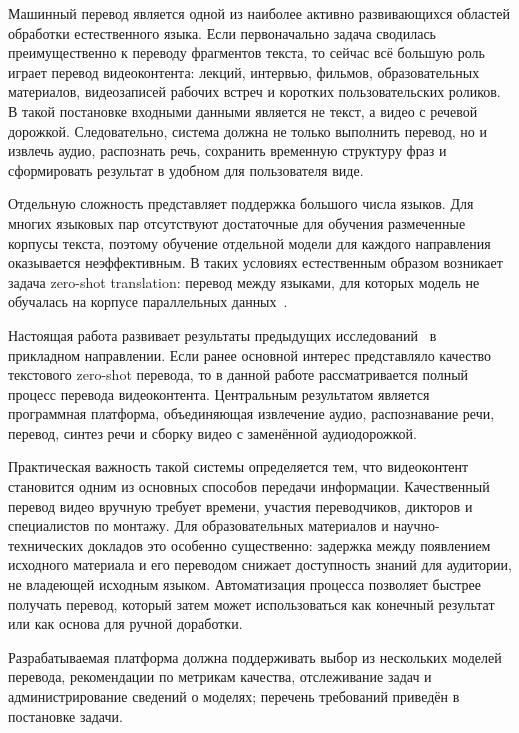 \documentclass[a4paper,article,14pt]{extarticle}
\begin{document}




\setcounter{tocdepth}{3}
\tableofcontents
\pagebreak


Машинный перевод является одной из наиболее активно развивающихся областей обработки естественного языка. Если первоначально задача сводилась преимущественно к переводу фрагментов текста, то сейчас всё большую роль играет перевод видеоконтента: лекций, интервью, фильмов, образовательных материалов, видеозаписей рабочих встреч и коротких пользовательских роликов. В такой постановке входными данными является не текст, а видео с речевой дорожкой. Следовательно, система должна не только выполнить перевод, но и извлечь аудио, распознать речь, сохранить временную структуру фраз и сформировать результат в удобном для пользователя виде.

Отдельную сложность представляет поддержка большого числа языков. Для многих языковых пар отсутствуют достаточные для обучения размеченные корпусы текста, поэтому обучение отдельной модели для каждого направления оказывается неэффективным. В таких условиях естественным образом возникает задача zero-shot translation: перевод между языками, для которых модель не обучалась на корпусе параллельных данных~\cite{Google}.

Настоящая работа развивает результаты предыдущих исследований~\cite{Devrishev2023} в прикладном направлении. Если ранее основной интерес представляло качество текстового zero-shot перевода, то в данной работе рассматривается полный процесс перевода видеоконтента. Центральным результатом является программная платформа, объединяющая извлечение аудио, распознавание речи, перевод, синтез речи и сборку видео с заменённой аудиодорожкой.

Практическая важность такой системы определяется тем, что видеоконтент становится одним из основных способов передачи информации. Качественный перевод видео вручную требует времени, участия переводчиков, дикторов и специалистов по монтажу. Для образовательных материалов и научно-технических докладов это особенно существенно: задержка между появлением исходного материала и его переводом снижает доступность знаний для аудитории, не владеющей исходным языком. Автоматизация процесса позволяет быстрее получать перевод, который затем может использоваться как конечный результат или как основа для ручной доработки.

Разрабатываемая платформа должна поддерживать выбор из нескольких моделей перевода, рекомендации по метрикам качества, отслеживание задач и администрирование сведений о моделях; перечень требований приведён в постановке задачи.
\end{document}
